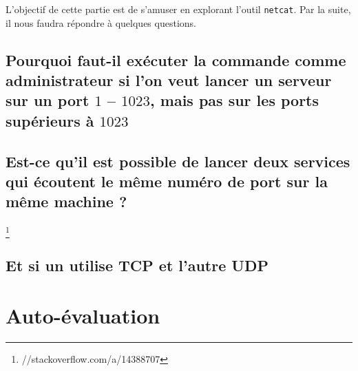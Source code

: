 \documentclass[11pt,a4paper]{article}
\begin{document}
L'objectif de cette partie est de s'amuser en explorant l'outil \texttt{netcat}. Par la suite, il nous faudra répondre à quelques questions.

\subsection{Pourquoi faut-il exécuter la commande comme administrateur si l'on veut lancer un serveur sur un port $1$ -- $1023$, mais pas sur les ports supérieurs à $1023$}
\subsection{Est-ce qu'il est possible de lancer deux services qui écoutent le même numéro de port sur la même machine ?}
\footnote{//stackoverflow.com/a/14388707}

\subsection{Et si un utilise TCP et l'autre UDP}

\section{Auto-évaluation}
\end{document}
